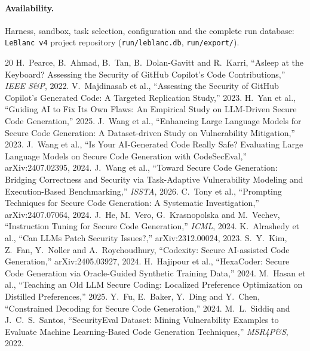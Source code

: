 \documentclass[10pt]{article}
\begin{document}
\paragraph{Availability.} Harness, sandbox, task selection, configuration and the complete run database:
\texttt{LeBlanc v4} project repository (\texttt{run/leblanc.db}, \texttt{run/export/}).

\begin{thebibliography}{20}\small
{} H.~Pearce, B.~Ahmad, B.~Tan, B.~Dolan-Gavitt and R.~Karri, ``Asleep at the Keyboard?
  Assessing the Security of GitHub Copilot's Code Contributions,'' \emph{IEEE S\&P}, 2022.
 V.~Majdinasab et al., ``Assessing the Security of GitHub Copilot's Generated
  Code: A Targeted Replication Study,'' 2023.
 H.~Yan et al., ``Guiding AI to Fix Its Own Flaws: An Empirical Study on LLM-Driven Secure
  Code Generation,'' 2025.
 J.~Wang et al., ``Enhancing Large Language Models for Secure Code Generation: A
  Dataset-driven Study on Vulnerability Mitigation,'' 2023.
 J.~Wang et al., ``Is Your AI-Generated Code Really Safe? Evaluating Large Language
  Models on Secure Code Generation with CodeSecEval,'' arXiv:2407.02395, 2024.
 J.~Wang et al., ``Toward Secure Code Generation: Bridging Correctness and Security via
  Task-Adaptive Vulnerability Modeling and Execution-Based Benchmarking,'' \emph{ISSTA}, 2026.
 C.~Tony et al., ``Prompting Techniques for Secure Code Generation: A Systematic
  Investigation,'' arXiv:2407.07064, 2024.
 J.~He, M.~Vero, G.~Krasnopolska and M.~Vechev, ``Instruction Tuning for Secure Code
  Generation,'' \emph{ICML}, 2024.
 K.~Alrashedy et al., ``Can LLMs Patch Security Issues?,'' arXiv:2312.00024, 2023.
 S.~Y.~Kim, Z.~Fan, Y.~Noller and A.~Roychoudhury, ``Codexity: Secure AI-assisted Code
  Generation,'' arXiv:2405.03927, 2024.
 H.~Hajipour et al., ``HexaCoder: Secure Code Generation via Oracle-Guided Synthetic
  Training Data,'' 2024.
 M.~Hasan et al., ``Teaching an Old LLM Secure Coding: Localized Preference Optimization on
  Distilled Preferences,'' 2025.
 Y.~Fu, E.~Baker, Y.~Ding and Y.~Chen, ``Constrained Decoding for Secure Code
  Generation,'' 2024.
 M.~L.~Siddiq and J.~C.~S.~Santos, ``SecurityEval Dataset: Mining Vulnerability
  Examples to Evaluate Machine Learning-Based Code Generation Techniques,'' \emph{MSR4P\&S}, 2022.
\end{thebibliography}
\end{document}
